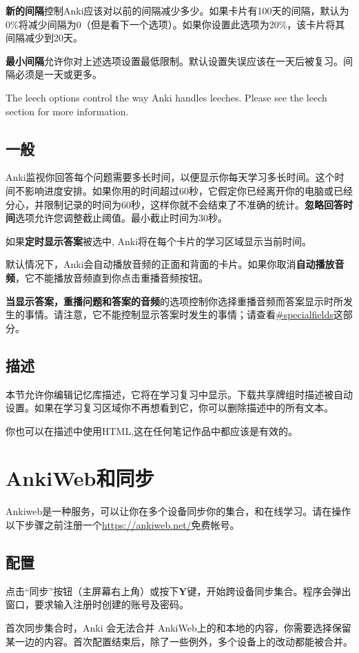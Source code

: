 \documentclass[a4paper]{book}
\begin{document}
		\textbf{新的间隔}控制Anki应该对以前的间隔减少多少。如果卡片有100天的间隔，默认为0\%将减少间隔为0（但是看下一个选项）。如果你设置此选项为20\%，该卡片将其间隔减少到20天。
		
		\textbf{最小间隔}允许你对上述选项设置最低限制。默认设置失误应该在一天后被复习。间隔必须是一天或更多。
		
		The leech options control the way Anki handles leeches. Please see the leech section for more information.
		\section{一般}
		Anki监视你回答每个问题需要多长时间，以便显示你每天学习多长时间。这个时间不影响进度安排。如果你用的时间超过60秒，它假定你已经离开你的电脑或已经分心，并限制记录的时间为60秒，这样你就不会结束了不准确的统计。\textbf{忽略回答时间}选项允许您调整截止阈值。最小截止时间为30秒。
		
		如果\textbf{定时显示答案}被选中, Anki将在每个卡片的学习区域显示当前时间。
		
		默认情况下，Anki会自动播放音频的正面和背面的卡片。如果你取消\textbf{自动播放音频}，它不能播放音频直到你点击重播音频按钮。
		
		\textbf{当显示答案，重播问题和答案的音频}的选项控制你选择重播音频而答案显示时所发生的事情。请注意，它不能控制显示答案时发生的事情；请查看\url{#specialfields}这部分。
		\section{描述}
		本节允许你编辑记忆库描述，它将在学习复习中显示。下载共享牌组时描述被自动设置。如果在学习复习区域你不再想看到它，你可以删除描述中的所有文本。
		
		你也可以在描述中使用HTML,这在任何笔记作品中都应该是有效的。
		
		
		\chapter{AnkiWeb和同步}
		
		Ankiweb是一种服务，可以让你在多个设备同步你的集合，和在线学习。请在操作以下步骤之前注册一个\url{https://ankiweb.net/}免费帐号。
		\section{配置}
		点击“同步”按钮（主屏幕右上角）或按下\textbf{Y}键，开始跨设备同步集合。程序会弹出窗口，要求输入注册时创建的账号及密码。
		
		首次同步集合时，Anki 会无法合并 AnkiWeb上的和本地的内容，你需要选择保留某一边的内容。首次配置结束后，除了一些例外，多个设备上的改动都能被合并。
		
\end{document}
